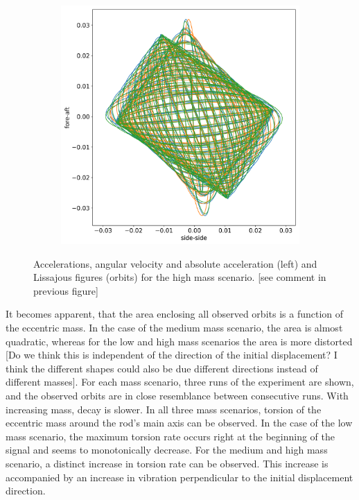 \documentclass{article}
\begin{document}
\begin{figure}
\begin{subfigure}[b]{0.45\textwidth}
        \includegraphics[width=\textwidth]{../results/experiment/high_mass_orbit.png}
        \caption{}
        \label{fig:high-mass:orbit}
    \end{subfigure}
    
    
    \caption{Accelerations, angular velocity and absolute acceleration (left) and Lissajous figures (orbits) for the high mass scenario. [see comment in previous figure]}
    \label{fig:high-mass}
\end{figure}

It becomes apparent, that the area enclosing all observed orbits is a function of the eccentric mass. In the case of the medium mass scenario, the area is almost quadratic, whereas for the low and high mass scenarios the area is more distorted [Do we think this is independent of the direction of the initial displacement? I think the different shapes could also be due different directions instead of different masses]. For each mass scenario, three runs of the experiment are shown, and the observed orbits are in close resemblance between consecutive runs. With increasing mass, decay is slower. In all three mass scenarios, torsion of the eccentric mass around the rod's main axis can be observed. In the case of the low mass scenario, the maximum torsion rate occurs right at the beginning of the signal and seems to monotonically decrease. For the medium and high mass scenario, a distinct increase in torsion rate can be observed. This increase is accompanied by an increase in vibration perpendicular to the initial displacement direction.
\end{document}
